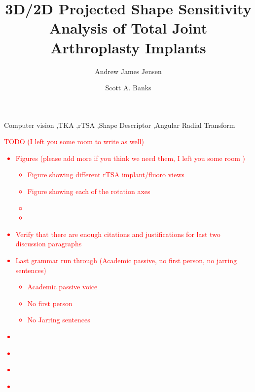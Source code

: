 \documentclass[preprint]{elsarticle}
\begin{document}
\linenumbers

\begin{frontmatter}
	\title{3D/2D Projected Shape Sensitivity Analysis of Total Joint Arthroplasty Implants}
	\author[a]{Andrew James Jensen}
	\author[a]{Scott A. Banks}
	
	\begin{keyword}
		Computer vision \sep TKA \sep rTSA \sep Shape Descriptor \sep Angular Radial Transform
	\end{keyword}
  \end{frontmatter}

  \begin{mdframed}
	\textcolor{red}{
	  {\Large TODO} {\footnotesize (I left you some room to write as well)}
	\begin{itemize}
	  \item Figures ({\footnotesize please add more if you think we need them, I left you some room })
			\begin{itemize}
			  \item Figure showing different rTSA implant/fluoro views
			  \item Figure showing each of the rotation axes
			  \item
			  \item
			\end{itemize}
	  \item Verify that there are enough citations and justifications for last two discussion paragraphs
	  \item Last grammar run through (Academic passive, no first person, no jarring sentences)
			\begin{itemize}
			  \item Academic passive voice
			  \item No first person
			  \item No Jarring sentences
			\end{itemize}
	  \item \\
	  \item \\
	  \item \\
	  \item \\
	\end{itemize}
	}
  \end{mdframed}










\end{document}
